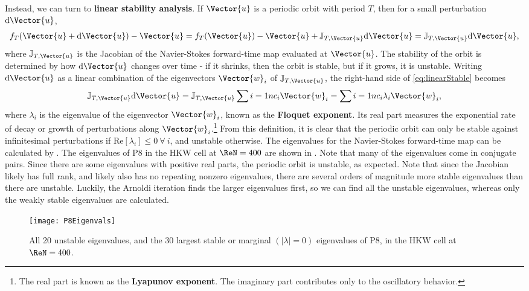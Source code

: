 Instead, we can turn to {\bf linear stability analysis}. If $\Vector{u}$ is a periodic orbit with period $T$, then for a small perturbation ${\bf \textrm{d}}\Vector{u}$, 
\begin{equation}\label{eq:linearStable}
 f_T(\Vector{u} + {\bf \textrm{d}}\Vector{u}) - \Vector{u} =  f_T(\Vector{u}) - \Vector{u} + \mathbb{J}_{T,\Vector{u}}{\bf \textrm{d}}\Vector{u} =  \mathbb{J}_{T,\Vector{u}}{\bf \textrm{d}}\Vector{u},
\end{equation} 
where $ \mathbb{J}_{T,\Vector{u}}$ is the Jacobian of the Navier-Stokes forward-time map evaluated at $\Vector{u}$. The stability of the orbit is determined by how  ${\bf \textrm{d}}\Vector{u}$ changes over time - if it shrinks, then the orbit is stable, but if it grows, it is unstable. Writing  ${\bf \textrm{d}}\Vector{u}$ as a linear combination of the eigenvectors $\Vector{w}_i$ of  $ \mathbb{J}_{T,\Vector{u}}$, the right-hand side of \eqref{eq:linearStable} becomes
\begin{equation}\label{eq:oneOrbit}
 \mathbb{J}_{T,\Vector{u}}{\bf \textrm{d}}\Vector{u} =  \mathbb{J}_{T,\Vector{u}}\sum{i = 1}{n}{c_i\Vector{w}_i} = \sum{i = 1}{n}{c_i\lambda_i\Vector{w}_i},
\end{equation}  
where $\lambda_i$ is the eigenvalue of the eigenvector $\Vector{w}_i$, known as the {\bf Floquet exponent}. Its real part measures the exponential rate of decay or growth of perturbations along $\Vector{w}_i$.\footnote{The real part is known as the {\bf Lyapunov exponent}. The imaginary part contributes only to the oscillatory behavior.}   From this definition, it is clear that the periodic orbit can only be stable against infinitesimal perturbations if $\textrm{Re}[\lambda_i]  \leq 0~\forall~i$, and unstable otherwise. The eigenvalues for the Navier-Stokes forward-time map can be calculated by . The eigenvalues of P8 in the HKW cell at $\ReN=400$ are shown in . Note that many of the eigenvalues come in conjugate pairs. Since there are some eigenvalues with positive real parts, the periodic orbit is unstable, as expected. Note that since the Jacobian likely has full rank, and likely also has no repeating nonzero eigenvalues, there are several orders of magnitude more stable eigenvalues than there are unstable. Luckily, the Arnoldi iteration finds the larger eigenvalues first, so we can find all the unstable eigenvalues, whereas only the weakly stable eigenvalues are calculated.\\

\begin{figure}[h]
\texttt{[image: P8Eigenvals]}
\caption{All 20 unstable eigenvalues, and the 30 largest stable or marginal $(|\lambda| = 0)$ eigenvalues of P8, in the HKW cell at $\ReN=400$. }\label{fig:P8Eigenvals}
\end{figure}

